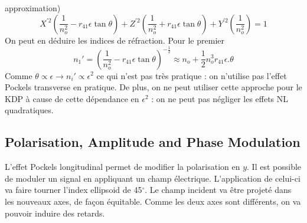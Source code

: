 approximation)
\begin{equation}
X^{'2}\left(\dfrac{1}{n_o^2}-r_{41}\epsilon\tan\theta\right)+
Z^{'2}\left(\dfrac{1}{n_o^2}+r_{41}\epsilon\tan\theta\right)+
Y^{'2}\left(\dfrac{1}{n_o^2}\right)=1
\end{equation}
On peut en déduire les indices de réfraction. Pour le premier
\begin{equation}
n_1' =\left(\dfrac{1}{n_o^2}-r_{41}\epsilon\tan\theta\right)^{-\frac{1}{2}}\approx
n_o+\frac{1}{2}n_o^3r_{41}\epsilon.\theta
\end{equation}
Comme $\theta\propto \epsilon\to n_i' \propto \epsilon^2$ ce qui n'est pas très pratique : on n'utilise
pas l'effet Pockels transverse en pratique. De plus, on ne peut utiliser cette approche pour le KDP à 
cause de cette dépendance en $\epsilon^2$ : on ne peut pas négliger les effets NL quadratiques.


\subsection{Polarisation, Amplitude and Phase Modulation}
L'effet Pockels longitudinal permet de modifier la polarisation en $y$. Il est possible de moduler un
signal en appliquant un champ électrique. L'application de celui-ci va faire tourner l'index ellipsoid
de 45$^\circ$. Le champ incident va être projeté dans les nouveaux axes, de façon équitable. Comme
les deux axes sont différents, on va pouvoir induire des retards. 

